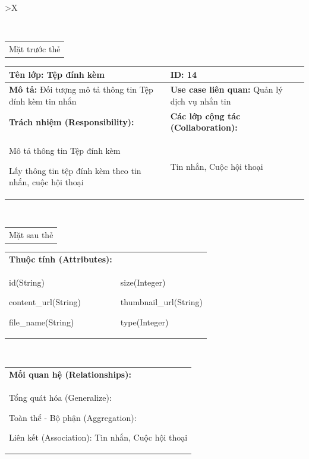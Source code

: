   \begin{xltabular}{\textwidth}{
    >{\centering\arraybackslash}X 
  }
  \caption{\bfseries \fontsize{12pt}{0pt}\selectfont Thẻ CRC lớp Tệp đính kèm}
  \\
  \begin{tabularx}{0.9\textwidth}{X}
    Mặt trước thẻ
  \end{tabularx}
  \begin{tabularx}{0.9\textwidth}{|X|X|}
    \hline
    \textbf{Tên lớp:} Tệp đính kèm & \textbf{ID:} 14 \\
    \hline
    \textbf{Mô tả:} Đối tượng mô tả thông tin Tệp đính kèm tin nhắn & \textbf{Use case liên quan:} Quản lý dịch vụ nhắn tin \\
    \hline
    \textbf{Trách nhiệm (Responsibility):} & \textbf{Các lớp cộng tác (Collaboration):} \\
    Mô tả thông tin Tệp đính kèm

    Lấy thông tin tệp đính kèm theo tin nhắn, cuộc hội thoại
    & 
    Tin nhắn, Cuộc hội thoại
    \\
    \hline
  \end{tabularx}
  \\ 
  \begin{tabularx}{0.9\textwidth}{X}
    Mặt sau thẻ
  \end{tabularx} 
  \begin{tabularx}{0.9\textwidth}{|X|X|}
    \hline
    \textbf{Thuộc tính (Attributes):} & \\
    id(String) 

    content\_url(String)
    
    file\_name(String)
    &
    size(Integer)

    thumbnail\_url(String)

    type(Integer)
    \\
    \hline
  \end{tabularx}
  \\     
  \begin{tabularx}{0.9\textwidth}{|X|}
    \textbf{Mối quan hệ (Relationships):} \\
    Tổng quát hóa (Generalize):  

    Toàn thể - Bộ phận (Aggregation): 
    
    Liên kết (Association): Tin nhắn, Cuộc hội thoại 
    \\
    \hline
  \end{tabularx}
  \end{xltabular}


